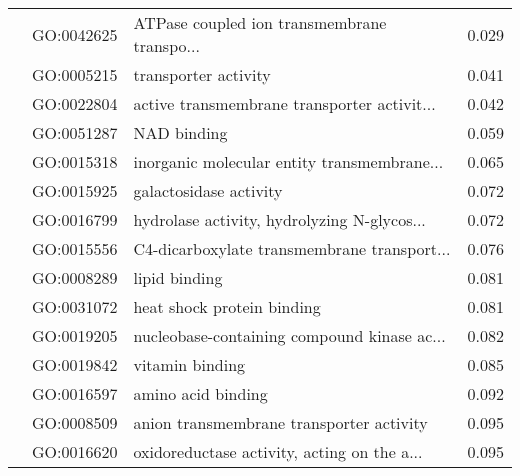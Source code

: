 \begin{longtable}{lllr}
   & GO:0042625 &  ATPase coupled ion transmembrane transpo... &         0.029 \\
   & GO:0005215 &                         transporter activity &         0.041 \\
   & GO:0022804 &  active transmembrane transporter activit... &         0.042 \\
   & GO:0051287 &                                  NAD binding &         0.059 \\
   & GO:0015318 &  inorganic molecular entity transmembrane... &         0.065 \\
   & GO:0015925 &                       galactosidase activity &         0.072 \\
   & GO:0016799 &  hydrolase activity, hydrolyzing N-glycos... &         0.072 \\
   & GO:0015556 &  C4-dicarboxylate transmembrane transport... &         0.076 \\
   & GO:0008289 &                                lipid binding &         0.081 \\
   & GO:0031072 &                   heat shock protein binding &         0.081 \\
   & GO:0019205 &  nucleobase-containing compound kinase ac... &         0.082 \\
   & GO:0019842 &                              vitamin binding &         0.085 \\
   & GO:0016597 &                           amino acid binding &         0.092 \\
   & GO:0008509 &     anion transmembrane transporter activity &         0.095 \\
   & GO:0016620 &  oxidoreductase activity, acting on the a... &         0.095 \\
\end{longtable}
